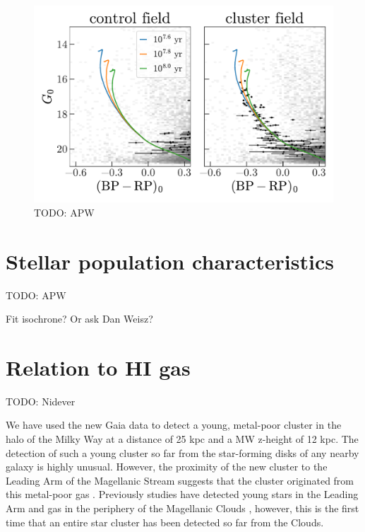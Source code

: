 \documentclass[modern]{aastex62}
\newcommand{\todo}[1]{{\color{red} TODO: #1}}
\begin{document}
\begin{figure}
\centering
\includegraphics[width=\textwidth]{figures/pm-members-cmd.pdf}
\caption{\todo{APW}
}
\label{fig:pm-members-cmd}
\end{figure}


\section{Stellar population characteristics}
\label{sec:popchars}

\todo{APW}

Fit isochrone? Or ask Dan Weisz?


\section{Relation to HI gas}
\label{sec:higas}

\todo{Nidever}

We have used the new Gaia data to detect a young, metal-poor cluster in the halo of the Milky Way at a distance of 25 kpc and a MW z-height of 12 kpc.  The detection of such a young cluster so far from the star-forming disks of any nearby
galaxy is highly unusual.  However, the proximity of the new cluster to the Leading Arm of the Magellanic Stream suggests
that the cluster originated from this metal-poor gas \citep{Fox:2018}.  Previously studies have detected young stars in the Leading Arm and gas in the periphery of the Magellanic Clouds \citep{Casetti-Dinescu:2014, MoniBidin:2017}, however, this is the first time that an entire star cluster has been detected so far from the Clouds.
\end{document}
